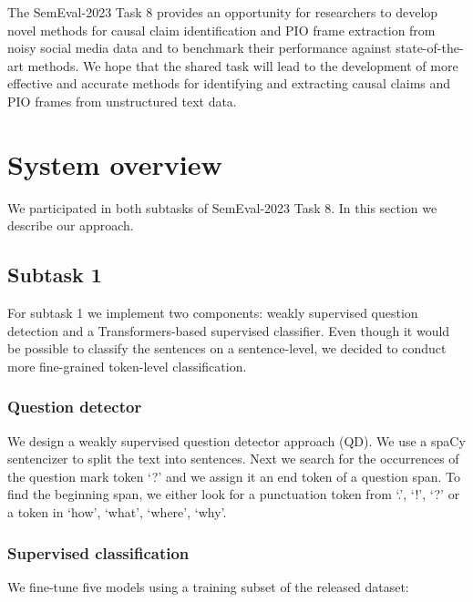 \documentclass[11pt]{article}
\begin{document}
The SemEval-2023 Task 8 provides an opportunity for researchers to develop novel methods for causal claim identification and PIO frame extraction from noisy social media data and to benchmark their performance against state-of-the-art methods.
We hope that the shared task will lead to the development of more effective and accurate methods for identifying and extracting causal claims and PIO frames from unstructured text data.
%
%
%
\section{System overview}
\label{system_over}
%
We participated in both subtasks of SemEval-2023 Task 8. 
In this section we describe our approach.
%
%
%
\subsection{Subtask 1} \label{sec:system1}
\label{subsec:syst_task1}
%
For subtask 1 we implement two components: weakly supervised question detection and a Transformers-based supervised classifier.
Even though it would be possible to classify the sentences on a sentence-level, we decided to conduct more fine-grained token-level classification.

\subsubsection*{Question detector}


We design a weakly supervised question detector approach (QD).
We use a spaCy sentencizer to split the text into sentences.
Next we search for the occurrences of the question mark token `?' and we assign it an end token of a question span.
To find the beginning span, we either look for a punctuation token from `.’, `!’, `?’ or a token in `how’, ‘what’, ‘where’, `why’.



\subsubsection*{Supervised classification}


We fine-tune five models using a training subset of the released dataset:
\end{document}
